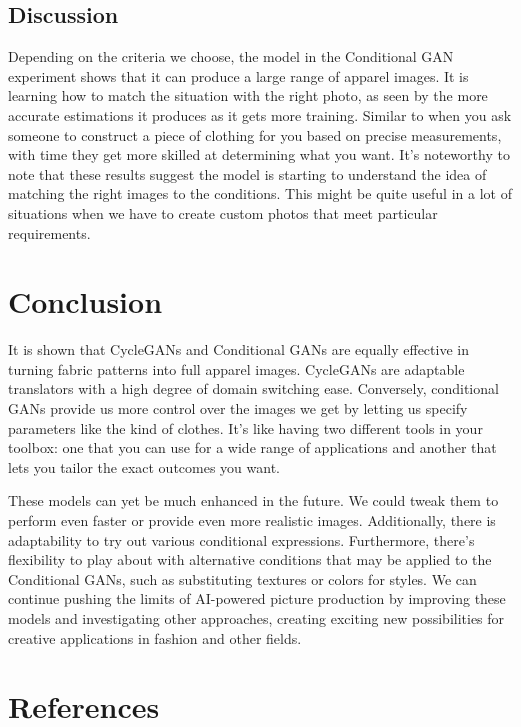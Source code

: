 \documentclass{article}
\begin{document}
\subsection{Discussion}
Depending on the criteria we choose, the model in the Conditional GAN experiment shows that it can produce a large range of apparel images. It is learning how to match the situation with the right photo, as seen by the more accurate estimations it produces as it gets more training. Similar to when you ask someone to construct a piece of clothing for you based on precise measurements, with time they get more skilled at determining what you want. It's noteworthy to note that these results suggest the model is starting to understand the idea of matching the right images to the conditions. This might be quite useful in a lot of situations when we have to create custom photos that meet particular requirements.



\section{Conclusion}
It is shown that CycleGANs and Conditional GANs are equally effective in turning fabric patterns into full apparel images. CycleGANs are adaptable translators with a high degree of domain switching ease. Conversely, conditional GANs provide us more control over the images we get by letting us specify parameters like the kind of clothes. It's like having two different tools in your toolbox: one that you can use for a wide range of applications and another that lets you tailor the exact outcomes you want.

These models can yet be much enhanced in the future. We could tweak them to perform even faster or provide even more realistic images. Additionally, there is adaptability to try out various conditional expressions. Furthermore, there's flexibility to play about with alternative conditions that may be applied to the Conditional GANs, such as substituting textures or colors for styles. We can continue pushing the limits of AI-powered picture production by improving these models and investigating other approaches, creating exciting new possibilities for creative applications in fashion and other fields.


\section*{References}
\end{document}

